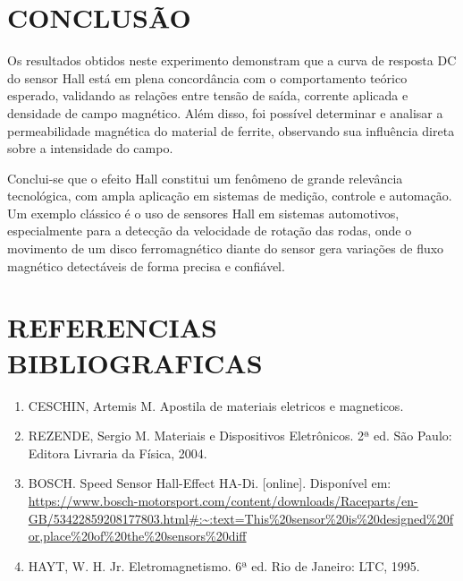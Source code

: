 \documentclass[10pt,twocolumn,letterpaper]{article}
\begin{document}
\section{CONCLUSÃO}

\hspace{1cm} Os resultados obtidos neste experimento demonstram que a curva de resposta DC do sensor Hall está em plena concordância com o comportamento teórico esperado, validando as relações entre tensão de saída, corrente aplicada e densidade de campo magnético. Além disso, foi possível determinar e analisar a permeabilidade magnética do material de ferrite, observando sua influência direta sobre a intensidade do campo.

\hspace{1cm} Conclui-se que o efeito Hall constitui um fenômeno de grande relevância tecnológica, com ampla aplicação em sistemas de medição, controle e automação. Um exemplo clássico é o uso de sensores Hall em sistemas automotivos, especialmente para a detecção da velocidade de rotação das rodas, onde o movimento de um disco ferromagnético diante do sensor gera variações de fluxo magnético detectáveis de forma precisa e confiável.

\section{REFERENCIAS BIBLIOGRAFICAS}

\small
\begin{enumerate}

    \item CESCHIN, Artemis M. Apostila de materiais eletricos e magneticos.
    
    \item REZENDE, Sergio M. Materiais e Dispositivos Eletrônicos. 2ª ed. São Paulo: Editora Livraria da Física, 2004.

    \item BOSCH. Speed Sensor Hall-Effect HA-Di. [online]. Disponível em: \url{https://www.bosch-motorsport.com/content/downloads/Raceparts/en-GB/53422859208177803.html#:~:text=This%20sensor%20is%20designed%20for,place%20of%20the%20sensors%20diff}

    \item HAYT, W. H. Jr. Eletromagnetismo. 6ª ed. Rio de Janeiro: LTC, 1995.
    
\end{enumerate}
\end{document}
